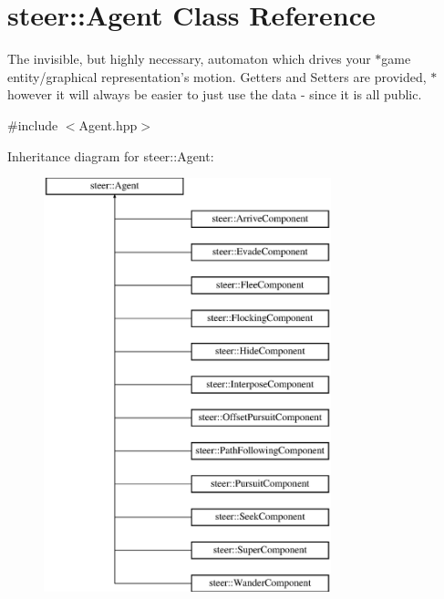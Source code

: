\hypertarget{classsteer_1_1_agent}{\section{steer\-:\-:Agent Class Reference}
\label{classsteer_1_1_agent}
}


The invisible, but highly necessary, automaton which drives your $\ast$game entity/graphical representation's motion. Getters and Setters are provided, $\ast$however it will always be easier to just use the data -\/ since it is all public.  




{\ttfamily \#include $<$Agent.\-hpp$>$}

Inheritance diagram for steer\-:\-:Agent\-:\begin{figure}[H]
\begin{center}
\leavevmode
\includegraphics[height=12.000000cm]{classsteer_1_1_agent}
\end{center}
\end{figure}
